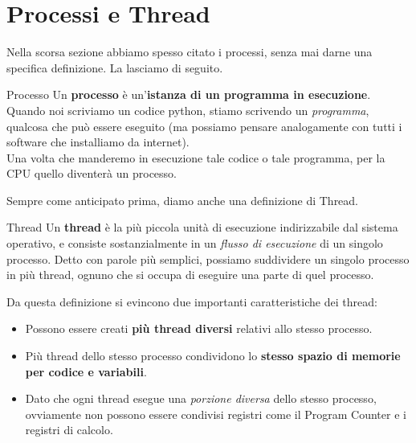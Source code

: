 \documentclass[12pt]{report}
\begin{document}
	\section{Processi e Thread}
	Nella scorsa sezione abbiamo spesso citato i processi, senza mai darne una specifica definizione. La lasciamo di seguito.
	\begin{definizione}{Processo}{}
		Un \textbf{processo} è un'\textbf{istanza di un programma in esecuzione}.
		Quando noi scriviamo un codice python, stiamo scrivendo un \textit{programma}, qualcosa che può essere eseguito (ma possiamo pensare analogamente con tutti i software che installiamo da internet).\\
		Una volta che manderemo in esecuzione tale codice o tale programma, per la CPU quello diventerà un processo.
	\end{definizione}
	
	Sempre come anticipato prima, diamo anche una definizione di Thread.
	\begin{definizione}{Thread}{}
		Un \textbf{thread} è la più piccola unità di esecuzione indirizzabile dal sistema operativo, e consiste sostanzialmente in un \textit{flusso di esecuzione} di un singolo processo.
		Detto con parole più semplici, possiamo suddividere un singolo processo in più thread, ognuno che si occupa di eseguire una parte di quel processo.
	\end{definizione}
	Da questa definizione si evincono due importanti caratteristiche dei thread:
	\begin{itemize}
		\item Possono essere creati \textbf{più thread diversi} relativi allo stesso processo.
		
		\item Più thread dello stesso processo condividono lo \textbf{stesso spazio di memorie per codice e variabili}.
		
		\item Dato che ogni thread esegue una \textit{porzione diversa} dello stesso processo, ovviamente non possono essere condivisi registri come il Program Counter e i registri di calcolo.
	\end{itemize}
	
\end{document}
